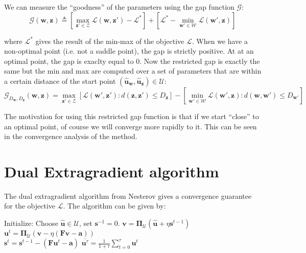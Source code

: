 \documentclass{article}
\renewcommand{\vec}{\mathbf}
\begin{document}
We can measure the ``goodness'' of the parameters using the gap function
$\mathcal{G}$:
\begin{equation}
  \mathcal{G}(\vec w, \vec z) \triangleq \left[ \max_{\vec z' \in \mathcal{Z}}
\mathcal{L}(\vec w,\vec z') - \mathcal{L}^* \right] + \left[ \mathcal{L}^* -
\min_{\vec w' \in \mathcal{W}} \mathcal{L}(\vec w', \vec z) \right]
\end{equation}

where $\mathcal{L}^*$ gives the result of the min-max of the objective
$\mathcal{L}$. When we have a non-optimal point (i.e. not a saddle point), the
gap is strictly positive. At at an optimal point, the gap is exaclty equal to 0.
Now the restricted gap is exactly the same but the min and max are computed over
a set of parameters that are within a certain distance of the start point
$(\hat{\vec u}_{\vec w},\hat{\vec u}_{\vec z}) \in \mathcal{U}$:
\begin{equation}
  \mathcal{G}_{D_{\vec w}, D_{\vec z}}(\vec w, \vec z) = \max_{\vec z' \in
\mathcal{Z}} \left[ \mathcal{L}(\vec w', \vec z') : d(\vec z, \vec z') \leq
D_{\vec z} \right] - \left [ \min_{\vec w' \in \mathcal{W}} \mathcal{L}(\vec w',
\vec z) : d(\vec w, \vec w') \leq D_{\vec w'} \right ]
\end{equation}

The motivation for using this restricted gap function is that if we start ``close'' to an optimal point, of course we will converge more rapidly to it. This can be seen in the convergence analysis of the method. 


\section{Dual Extragradient algorithm}

The dual extragradient algorithm from Nesterov gives a convergence guarantee for the objective $\mathcal{L}$. The algorithm can be given by:

\begin{algorithmic}
  \STATE Initialize: Choose $\hat{\vec u} \in \mathcal{U}$, set $\vec s^{-1} = 0$.
  \STATE $\vec v = \mathbf{\Pi}_{\mathcal{U}}(\hat{\vec u} + \eta \vec s^{t-1})$\\
  \STATE $\vec u^t = \mathbf{\Pi}_{\mathcal{U}}(\vec v - \eta (\vec F \vec v - \vec a))$\\
  \STATE $\vec s^t =  \vec s^{t-1} - (\vec F \vec u^t - \vec a)$
  \ENDFOR
  \RETURN $\overline{\vec u^{\tau}} = \frac{1}{1 + \tau} \sum_{t=0}^{\tau} \vec u^t$
\end{algorithmic}
\end{document}
